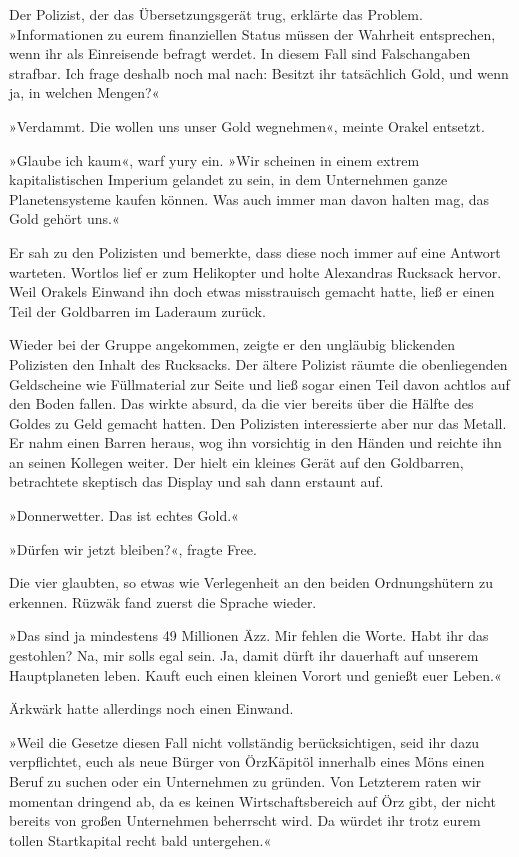 Der Polizist, der das Übersetzungsgerät trug, erklärte das Problem. »Informationen zu eurem finanziellen Status müssen der Wahrheit entsprechen, wenn ihr als Einreisende befragt werdet. In diesem Fall sind Falschangaben strafbar. Ich frage deshalb noch mal nach: Besitzt ihr tatsächlich Gold, und wenn ja, in welchen Mengen?«

»Verdammt. Die wollen uns unser Gold wegnehmen«, meinte Orakel entsetzt.

»Glaube ich kaum«, warf yury ein. »Wir scheinen in einem extrem kapitalistischen Imperium gelandet zu sein, in dem Unternehmen ganze Planetensysteme kaufen können. Was auch immer man davon halten mag, das Gold gehört uns.«

Er sah zu den Polizisten und bemerkte, dass diese noch immer auf eine Antwort warteten. Wortlos lief er zum Helikopter und holte Alexandras Rucksack hervor. Weil Orakels Einwand ihn doch etwas misstrauisch gemacht hatte, ließ er einen Teil der Goldbarren im Laderaum zurück.

Wieder bei der Gruppe angekommen, zeigte er den ungläubig blickenden Polizisten den Inhalt des Rucksacks. Der ältere Polizist räumte die obenliegenden Geldscheine wie Füllmaterial zur Seite und ließ sogar einen Teil davon achtlos auf den Boden fallen. Das wirkte absurd, da die vier bereits über die Hälfte des Goldes zu Geld gemacht hatten. Den Polizisten interessierte aber nur das Metall. Er nahm einen Barren heraus, wog ihn vorsichtig in den Händen und reichte ihn an seinen Kollegen weiter. Der hielt ein kleines Gerät auf den Goldbarren, betrachtete skeptisch das Display und sah dann erstaunt auf.

»Donnerwetter. Das ist echtes Gold.«

»Dürfen wir jetzt bleiben?«, fragte Free.

Die vier glaubten, so etwas wie Verlegenheit an den beiden Ordnungshütern zu erkennen. Rüzwäk fand zuerst die Sprache wieder.

»Das sind ja mindestens 49 Millionen Äzz. Mir fehlen die Worte. Habt ihr das gestohlen? Na, mir solls egal sein. Ja, damit dürft ihr dauerhaft auf unserem Hauptplaneten leben. Kauft euch einen kleinen Vorort und genießt euer Leben.«

Ärkwärk hatte allerdings noch einen Einwand.

»Weil die Gesetze diesen Fall nicht vollständig berücksichtigen, seid ihr dazu verpflichtet, euch als neue Bürger von ÖrzKäpitöl innerhalb eines Möns einen Beruf zu suchen oder ein Unternehmen zu gründen. Von Letzterem raten wir momentan dringend ab, da es keinen Wirtschaftsbereich auf Örz gibt, der nicht bereits von großen Unternehmen beherrscht wird. Da würdet ihr trotz eurem tollen Startkapital recht bald untergehen.«

